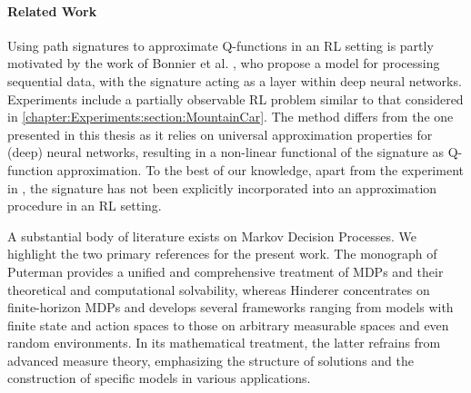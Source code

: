 \documentclass[
    a4paper,
    11pt,
    bibliography=totoc,
    listof=totoc,      
    headinclude=true,
    cleardoublepage=empty,
]{scrbook}
\theoremstyle{plain}
\theoremstyle{definition}
\theoremstyle{remark}
\begin{document}
\paragraph{Related Work}
\label{chapter:Introduction:par:RelatedWork}

Using path signatures to approximate Q-functions in an RL setting is partly
motivated by the work of Bonnier et al. \cite{bonnier2019_dst}, who propose a model
for processing sequential data, with the signature acting as a layer
within deep neural networks. Experiments include a partially observable 
RL problem similar to that considered in 
\cref{chapter:Experiments:section:MountainCar}. The method differs from the 
one presented in this thesis as it relies on universal approximation 
properties for (deep) neural networks, resulting in a non-linear functional of 
the signature as Q-function approximation. To the best of our knowledge, apart 
from the experiment in \cite{bonnier2019_dst}, the signature has not been 
explicitly incorporated into an approximation procedure in an RL setting.

A substantial body of literature exists on Markov Decision Processes. We 
highlight the two primary references for the present work. The monograph 
of Puterman \cite{puterman2005_mdpdsdp} provides a unified and 
comprehensive treatment of MDPs and their theoretical and computational 
solvability, whereas Hinderer \cite{hinderer2016_do} concentrates on 
finite-horizon MDPs and develops several frameworks ranging from models with 
finite state and action spaces to those on arbitrary measurable spaces and even 
random environments. In its mathematical treatment, the 
latter refrains from advanced measure theory, emphasizing the structure of 
solutions and the construction of specific models in various applications.
\end{document}
